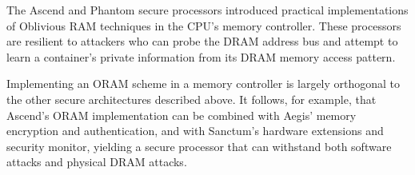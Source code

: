 \label{sec:sgx_related_ascend}

The Ascend \cite{fletcher2012ascend} and Phantom \cite{maas2013phantom} secure
processors introduced practical implementations of Oblivious RAM
\cite{goldreich1987oram} techniques in the CPU's memory controller. These
processors are resilient to attackers who can probe the DRAM address bus and
attempt to learn a container's private information from its DRAM memory access
pattern.

Implementing an ORAM scheme in a memory controller is largely orthogonal to the
other secure architectures described above. It follows, for example, that
Ascend's ORAM implementation can be combined with Aegis' memory encryption and
authentication, and with Sanctum's hardware extensions and security monitor,
yielding a secure processor that can withstand both software attacks and
physical DRAM attacks.

